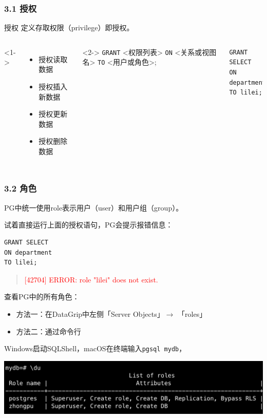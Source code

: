 \documentclass[aspectratio=169, 14pt]{beamer}
\begin{document}
\begin{frame}[fragile]
    \frametitle{3.1 授权}
\begin{exampleblock}{授权}
定义存取权限（privilege）即授权。    
\end{exampleblock}

\begin{columns}
    <1->
    \begin{itemize}
        \item 授权读取数据
        \item 授权插入新数据
        \item 授权更新数据
        \item 授权删除数据
    \end{itemize}
    <2->
\alert{\texttt{GRANT}} <权限列表>
\alert{\texttt{ON}} <关系或视图名>
\alert{\texttt{TO}} <用户或角色>;

\begin{verbatim}
GRANT SELECT 
ON department 
TO lilei;
\end{verbatim}
\end{columns}

\end{frame}

\begin{frame}[fragile]
    \frametitle{3.2 角色}

PG中统一使用role表示用户（user）和用户组（group）。

试着直接运行上面的授权语句，PG会提示报错信息：

\begin{verbatim}
GRANT SELECT 
ON department 
TO lilei;
\end{verbatim}

\begin{quotation}
    \textcolor{red}{[42704] ERROR: role "lilei" does not exist.}
\end{quotation}

\end{frame}

\begin{frame}
查看PG中的所有角色：

\begin{itemize}
    \item 方法一：在DataGrip中左侧「Server Objects」$\rightarrow$ 「roles」
    \item 方法二：通过命令行
\end{itemize}

Windows启动SQLShell，macOS在终端输入\texttt{pgsql mydb}，

\includegraphics[width=\textwidth]{advanced/du}

\end{frame}
\end{document}
